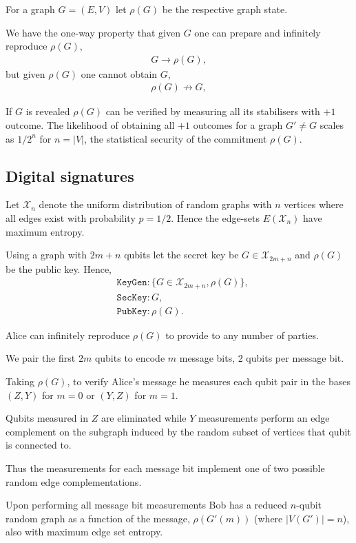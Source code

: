 \documentclass[twocolumn, aps, amsmath, amssymb, nofootinbib, superscriptaddress, longbibliography, doublefloatfix, table-of-contents, eqsecnum, rmp]{revtex4-2}
\begin{document}
For a graph \mbox{$G=(E,V)$} let $\rho(G)$ be the respective graph state.

We have the one-way property that given $G$ one can prepare and infinitely reproduce $\rho(G)$,
\begin{align}
	G \to \rho(G),	
\end{align}
but given $\rho(G)$ one cannot obtain $G$,
\begin{align}
	\rho(G) \not\to G,	
\end{align}

If $G$ is revealed $\rho(G)$ can be verified by measuring all its stabilisers with $+1$ outcome. The likelihood of obtaining all $+1$ outcomes for a graph $G'\neq G$ scales as $1/2^n$ for $n=|V|$, the statistical security of the commitment $\rho(G)$.

\subsection{Digital signatures}

Let $\mathcal{X}_n$ denote the uniform distribution of random graphs with $n$ vertices where all edges exist with probability $p=1/2$. Hence the edge-sets $E(\mathcal{X}_n)$ have maximum entropy.

Using a graph with $2m+n$ qubits let the secret key be $G\in\mathcal{X}_{2m+n}$ and $\rho(G)$ be the public key. Hence,
\begin{align}
	&\texttt{KeyGen}: \{G\in\mathcal{X}_{2m+n},\rho(G)\},\nonumber\\
	&\texttt{SecKey}: G,\nonumber\\
	&\texttt{PubKey}: \rho(G).
\end{align}

Alice can infinitely reproduce $\rho(G)$ to provide to any number of parties.

We pair the first $2m$ qubits to encode $m$ message bits, 2 qubits per message bit.

Taking $\rho(G)$, to verify Alice's message he measures each qubit pair in the bases $(Z,Y)$ for $m=0$ or $(Y,Z)$ for $m=1$.

Qubits measured in $Z$ are eliminated while $Y$ measurements perform an edge complement on the subgraph induced by the random subset of vertices that qubit is connected to.

Thus the measurements for each message bit implement one of two possible random edge complementations.

Upon performing all message bit measurements Bob has a reduced $n$-qubit random graph as a function of the message, $\rho(G'(m))$ (where $|V(G')|=n$), also with maximum edge set entropy.
\end{document}
